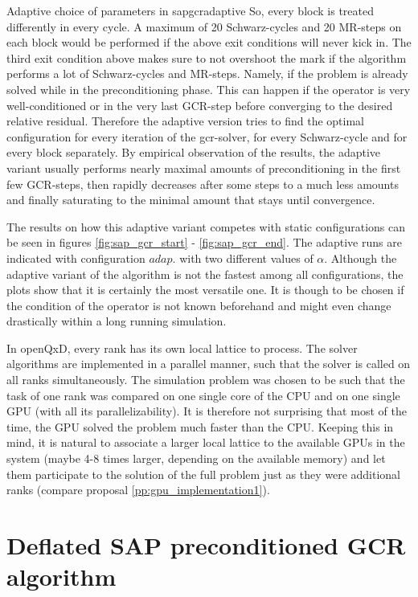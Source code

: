 \documentclass{article}
\theoremstyle{plain} %
\theoremstyle{convention} %
\theoremstyle{remark} %
\numberwithin{equation}{section}
\begin{document}
\begin{proposal}{Adaptive choice of parameters in \acrshort{sapgcr}}{adaptive}
So, every block is treated differently in every cycle. A maximum of \num{20} Schwarz-cycles and \num{20} MR-steps on each block would be performed if the above exit conditions will never kick in. The third exit condition above makes sure to not overshoot the mark if the algorithm performs a lot of Schwarz-cycles and MR-steps. Namely, if the problem is already solved while in the preconditioning phase. This can happen if the operator is very well-conditioned or in the very last GCR-step before converging to the desired relative residual. Therefore the adaptive version tries to find the optimal configuration for every iteration of the \acrshort{gcr}-solver, for every Schwarz-cycle and for every block separately. By empirical observation of the results, the adaptive variant usually performs nearly maximal amounts of preconditioning in the first few GCR-steps, then rapidly decreases after some steps to a much less amounts and finally saturating to the minimal amount that stays until convergence.

The results on how this adaptive variant competes with static configurations can be seen in figures \ref{fig:sap_gcr_start} - \ref{fig:sap_gcr_end}. The adaptive runs are indicated with configuration $adap.$ with two different values of $\alpha$. Although the adaptive variant of the algorithm is not the fastest among all configurations, the plots show that it is certainly the most versatile one. It is though to be chosen if the condition of the operator is not known beforehand and might even change drastically within a long running simulation.

\end{proposal}

In openQxD, every rank has its own local lattice to process. The solver algorithms are implemented in a parallel manner, such that the solver is called on all ranks simultaneously. The simulation problem was chosen to be such that the task of one rank was compared on one single core of the CPU and on one single GPU (with all its parallelizability). It is therefore not surprising that most of the time, the GPU solved the problem much faster than the CPU. Keeping this in mind, it is natural to associate a larger local lattice to the available GPUs in the system (maybe 4-8 times larger, depending on the available memory) and let them participate to the solution of the full problem just as they were additional ranks (compare proposal \ref{pp:gpu_implementation1}).

\section{Deflated SAP preconditioned GCR algorithm}
\end{document}
